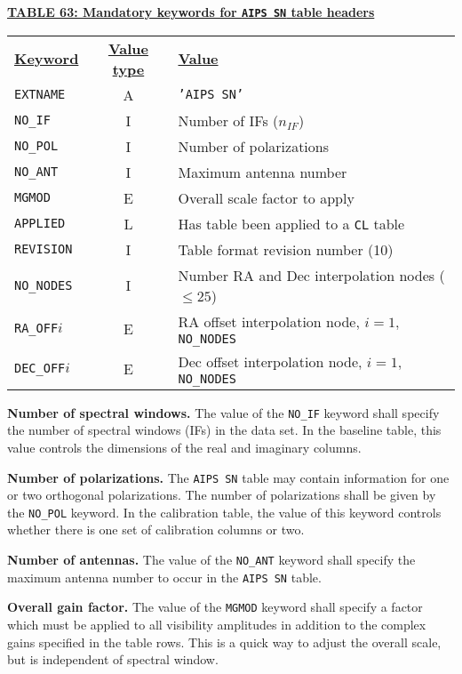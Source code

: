 \documentclass[twoside]{article}
\newcommand{\nif}{$n_{IF}$}
\begin{document}
\begin{center}
\underline{\bf{TABLE 63: Mandatory keywords for {\tt AIPS SN} table
    headers}}\\
\begin{tabular}{lcl}
\noalign{\vspace{2pt}} \label{ta:SNkeys}
\underline{{\bf Keyword}} & \underline{\bf{Value type}} &
    \underline{\bf{Value\vphantom{y}}} \\
\noalign{\vspace{2pt}}
{\tt EXTNAME}   & A & {\tt 'AIPS SN'}  \\
{\tt NO\_IF}    & I & Number of IFs (\nif)\\
{\tt NO\_POL}   & I & Number of polarizations \\
{\tt NO\_ANT}   & I & Maximum antenna number \\
{\tt MGMOD}     & E & Overall scale factor to apply \\
{\tt APPLIED}   & L & Has table been applied to a {\tt CL} table \\
{\tt REVISION}  & I & Table format revision number (10) \\
{\tt NO\_NODES} & I & Number RA and Dec interpolation nodes ($\leq 25$) \\
{\tt RA\_OFF}$i$  & E & RA offset interpolation node, $i=1,${\tt NO\_NODES} \\
{\tt DEC\_OFF}$i$ & E & Dec offset interpolation node, $i=1,${\tt NO\_NODES}
\end{tabular}
\end{center}

{\bf Number of spectral windows.} The value of the {\tt NO\_IF}
keyword shall specify the number of spectral windows (IFs) in the data
set.  In the baseline table, this value controls the dimensions of the
real and imaginary columns.

{\bf Number of polarizations.}  The {\tt AIPS SN} table may contain
information for one or two orthogonal polarizations.  The number of
polarizations shall be given by the {\tt NO\_POL} keyword.   In the
calibration table, the value of this keyword controls whether there is
one set of calibration columns or two.

{\bf Number of antennas.} The value of the {\tt NO\_ANT} keyword shall
specify the maximum antenna number to occur in the {\tt AIPS SN} table.

{\bf Overall gain factor.} The value of the {\tt MGMOD} keyword shall
specify a factor which must be applied to all visibility amplitudes in
addition to the complex gains specified in the table rows.  This is a
quick way to adjust the overall scale, but is independent of spectral
window.
\end{document}
